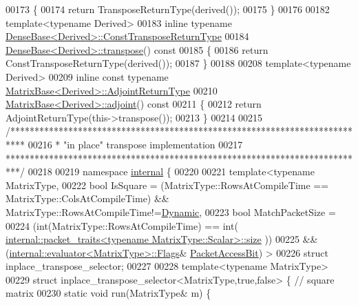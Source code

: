 \begin{DoxyCode}
00173 \{
00174   \textcolor{keywordflow}{return} TransposeReturnType(derived());
00175 \}
00176 
00182 \textcolor{keyword}{template}<\textcolor{keyword}{typename} Derived>
00183 \textcolor{keyword}{inline} \textcolor{keyword}{typename} \hyperlink{group___core___module_class_eigen_1_1_transpose}{DenseBase<Derived>::ConstTransposeReturnType}
00184 \hyperlink{group___core___module_ac8952c19644a4ac7e41bea45c19b909c}{DenseBase<Derived>::transpose}()\textcolor{keyword}{ const}
00185 \textcolor{keyword}{}\{
00186   \textcolor{keywordflow}{return} ConstTransposeReturnType(derived());
00187 \}
00188 
00208 \textcolor{keyword}{template}<\textcolor{keyword}{typename} Derived>
00209 \textcolor{keyword}{inline} \textcolor{keyword}{const} \textcolor{keyword}{typename} \hyperlink{class_eigen_1_1internal_1_1_tensor_lazy_evaluator_writable}{MatrixBase<Derived>::AdjointReturnType}
00210 \hyperlink{group___core___module_afacca1f88da57e5cd87dd07c8ff926bb}{MatrixBase<Derived>::adjoint}()\textcolor{keyword}{ const}
00211 \textcolor{keyword}{}\{
00212   \textcolor{keywordflow}{return} AdjointReturnType(this->transpose());
00213 \}
00214 
00215 \textcolor{comment}{/***************************************************************************}
00216 \textcolor{comment}{* "in place" transpose implementation}
00217 \textcolor{comment}{***************************************************************************/}
00218 
00219 \textcolor{keyword}{namespace }\hyperlink{namespaceinternal}{internal} \{
00220 
00221 \textcolor{keyword}{template}<\textcolor{keyword}{typename} MatrixType,
00222   \textcolor{keywordtype}{bool} IsSquare = (MatrixType::RowsAtCompileTime == MatrixType::ColsAtCompileTime) && 
      MatrixType::RowsAtCompileTime!=\hyperlink{namespace_eigen_ad81fa7195215a0ce30017dfac309f0b2}{Dynamic},
00223   \textcolor{keywordtype}{bool} MatchPacketSize =
00224         (\textcolor{keywordtype}{int}(MatrixType::RowsAtCompileTime) == int(
      \hyperlink{struct_eigen_1_1internal_1_1packet__traits}{internal::packet\_traits<typename MatrixType::Scalar>::size}
      ))
00225     &&  (\hyperlink{struct_eigen_1_1internal_1_1evaluator}{internal::evaluator<MatrixType>::Flags}&
      \hyperlink{group__flags_ga1a306a438e1ab074e8be59512e887b9f}{PacketAccessBit}) >
00226 \textcolor{keyword}{struct }inplace\_transpose\_selector;
00227 
00228 \textcolor{keyword}{template}<\textcolor{keyword}{typename} MatrixType>
00229 \textcolor{keyword}{struct }inplace\_transpose\_selector<MatrixType,true,false> \{ \textcolor{comment}{// square matrix}
00230   \textcolor{keyword}{static} \textcolor{keywordtype}{void} run(MatrixType& m) \{

\end{DoxyCode}
